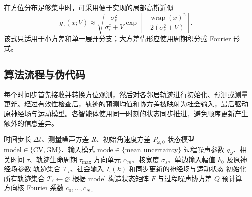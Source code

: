 \documentclass[UTF8,fontset=windows,11pt]{ctexart}
\begin{document}
在方位分布足够集中时，可采用便于实现的局部高斯近似
\begin{equation}
 \bar g_\sigma(x;V)\approx
 \sqrt{\frac{\sigma_s^2}{\sigma_s^2+V}}
 \exp\left[-\frac{\operatorname{wrap}(x)^2}{2(\sigma_s^2+V)}\right].
\end{equation}
该式只适用于小方差和单一展开分支；大方差情形应使用周期积分或 Fourier 形式。

\subsection{算法流程与伪代码}

每个时间步首先接收并转换方位观测，然后对各邻居轨迹进行初始化、预测或测量更新。经过有效性检查后，轨迹的预测均值和协方差被映射为社会输入，最后驱动原神经场与运动模型。各智能体使用同一时刻的状态同步推进，避免顺序更新产生额外的信息差异。

\begin{algorithm}[htbp]
 \caption{间歇方位观测下的Kalman预测与神经场输入补偿}
 \label{alg:kalman_compensation}
 \scriptsize
 \begin{algorithmic}[1]
 \Require 时间步长 $\Delta t$、测量噪声方差 $R$、初始角速度方差 $P_{\omega,0}$
 \Require 状态模型 $\mathrm{model}\in\{\mathrm{CV},\mathrm{GM}\}$、输入模式 $\mathrm{mode}\in\{\mathrm{mean},\mathrm{uncertainty}\}$
 \Require 过程噪声参数 $q_\omega$、相关时间 $\tau$、轨迹生命周期 $\tau_{\max}$
 \Require 方向单元 $\alpha_m$、核宽度 $\sigma_s$、单边输入幅值 $h_0$ 及原神经场参数
 \Ensure 轨迹集合 $\mathcal T_i$、社会输入 $I_i(k)$ 和同步更新的神经场与运动状态
 \State 初始化所有轨迹集合 $\mathcal T_i\leftarrow\varnothing$
 \State 根据 $\mathrm{model}$ 构造状态矩阵 $F$ 与过程噪声协方差 $Q$
  \State 预计算方向核 Fourier 系数 $c_0,\ldots,c_{N_F}$
 \EndIf
 \end{algorithmic}
\end{algorithm}
\clearpage
\end{document}
